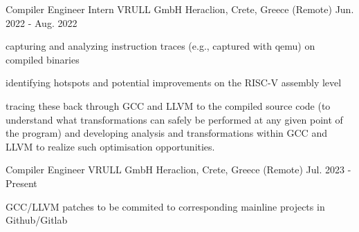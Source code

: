 
\begin{cventries}

  \cventry
    {Compiler Engineer Intern} %
    {VRULL GmbH} %
    {Heraclion, Crete, Greece (Remote)} %
    {Jun. 2022 - Aug. 2022} %
    {
      \begin{cvitems} %
        \item {capturing and analyzing instruction traces (e.g., captured with qemu) on compiled binaries}
	\item {identifying hotspots and potential improvements on the RISC-V assembly level}
	\item {tracing these back through GCC and LLVM to the compiled source code (to understand what
transformations can safely be performed at any given point of the program) and developing
analysis and transformations within GCC and LLVM to realize such optimisation opportunities.}
      \end{cvitems}
    }



  \cventry
    {Compiler Engineer} %
    {VRULL GmbH} %
    {Heraclion, Crete, Greece (Remote)} %
    {Jul. 2023 - Present} %
    {
      \begin{cvitems} %
        \item {GCC/LLVM patches to be commited to corresponding mainline projects in Github/Gitlab}
      \end{cvitems}
    }
\end{cventries}
